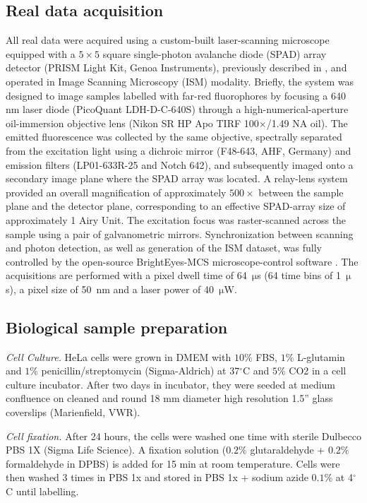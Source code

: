 \documentclass[letterpaper]{article}
\begin{document}
\subsection{Real data acquisition}
\label{real_data_acq}
All real data were acquired using a custom-built laser-scanning microscope equipped with a $5\times5$ square single-photon avalanche diode (SPAD) array detector (PRISM Light Kit, Genoa Instruments), previously described in \cite{slenders2025array, patil2025open}, and operated in Image Scanning Microscopy (ISM) modality. Briefly, the system was designed to image samples labelled with far-red fluorophores by focusing a 640 nm laser diode (PicoQuant LDH-D-C-640S) through a high-numerical-aperture oil-immersion objective lens (Nikon SR HP Apo TIRF 100$\times$/1.49 NA oil). The emitted fluorescence was collected by the same objective, spectrally separated from the excitation light using a dichroic mirror (F48-643, AHF, Germany) and emission filters (LP01-633R-25 and Notch 642), and subsequently imaged onto a secondary image plane where the SPAD array was located. A relay-lens system provided an overall magnification of approximately $500\times$ between the sample plane and the detector plane, corresponding to an effective SPAD-array size of approximately 1 Airy Unit. The excitation focus was raster-scanned across the sample using a pair of galvanometric mirrors. Synchronization between scanning and photon detection, as well as generation of the ISM dataset, was fully controlled by the open-source BrightEyes-MCS microscope-control software \cite{donato2024brighteyes}. 
The acquisitions are performed with a pixel dwell time of 64~$\mathrm{\mu}$s (64 time bins of 1~$\mathrm{\mu}$s), a pixel size of 50~nm and a laser power of 40~$\mathrm{\mu}$W.

\subsection{Biological sample preparation}

\textit{Cell Culture.} HeLa cells were grown in DMEM with $10\%$ FBS, $1\%$ L-glutamin and $1\%$ penicillin/streptomycin (Sigma-Aldrich) at 37$^{\circ}$C and $5\%$ CO2 in a cell culture incubator. After two days in incubator, they were seeded at medium confluence on cleaned and round 18 mm diameter high resolution 1.5'' glass coverslips (Marienfield, VWR).

\textit{Cell fixation.} After 24 hours, the cells were washed one time with sterile Dulbecco PBS 1X (Sigma Life Science). A fixation solution ($0.2\%$ glutaraldehyde + $0.2\%$ formaldehyde in DPBS) is added for 15 min at room temperature. Cells were then washed 3 times in PBS 1x and stored in PBS 1x + sodium azide $0.1\%$ at 4$^{\circ}$C until labelling. 
\end{document}

